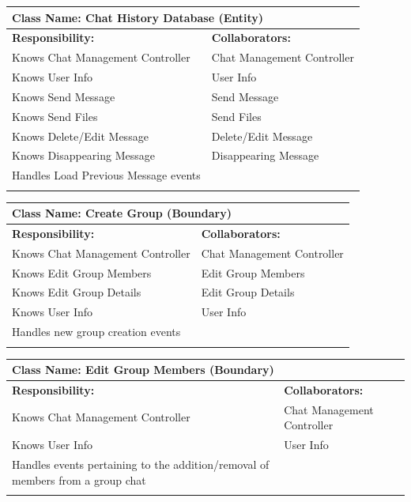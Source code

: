 \documentclass[]{article}
\begin{document}
	\begin{table}[ht]
		\centering
		\begin{tabular}{|p{7cm}|p{7cm}|}
		\hline 
		\multicolumn{2}{|l|}{\textbf{Class Name:} Chat History Database (Entity)} \\
		\hline
		\textbf{Responsibility:} & \textbf{Collaborators:} \\
		\hline
  			Knows Chat Management Controller & Chat Management Controller \\
     			Knows User Info & User Info \\
			Knows Send Message & Send Message \\
			Knows Send Files & Send Files \\
			Knows Delete/Edit Message & Delete/Edit Message\\
			Knows Disappearing Message & Disappearing Message \\
			Handles Load Previous Message events & \\
		\vspace{1in} & \\
		\hline
		\end{tabular}
	\end{table}

  	\begin{table}[ht]
		\centering
		\begin{tabular}{|p{7cm}|p{7cm}|}
		\hline 
		\multicolumn{2}{|l|}{\textbf{Class Name:} Create Group (Boundary)} \\
		\hline
		\textbf{Responsibility:} & \textbf{Collaborators:} \\
		\hline
  			Knows Chat Management Controller & Chat Management Controller \\
			Knows Edit Group Members & Edit Group Members \\
			Knows Edit Group Details & Edit Group Details \\
			Knows User Info & User Info \\
			Handles new group creation events &\\
		\vspace{1in} & \\
		\hline
		\end{tabular}
	\end{table}

   	\begin{table}[ht]
		\centering
		\begin{tabular}{|p{7cm}|p{7cm}|}
		\hline 
		\multicolumn{2}{|l|}{\textbf{Class Name:} Edit Group Members (Boundary)} \\
		\hline
		\textbf{Responsibility:} & \textbf{Collaborators:} \\
		\hline
  			Knows Chat Management Controller & Chat Management Controller \\
			Knows User Info & User Info \\
			Handles events pertaining to the addition/removal of members from a group chat &\\
		\vspace{1in} & \\
		\hline
		\end{tabular}
	\end{table}
\end{document}
